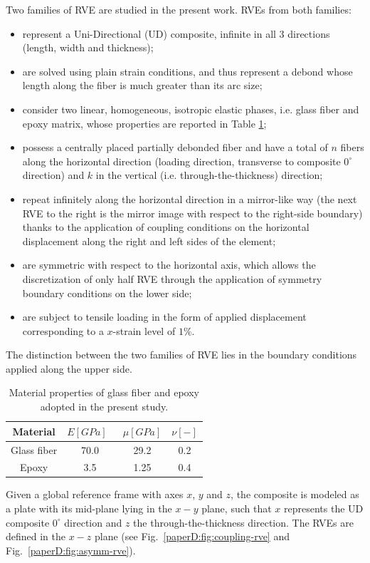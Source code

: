 Two families of RVE are studied in the present work. RVEs from both families:
\begin{itemize}
\item represent a Uni-Directional (UD) composite, infinite in all 3 directions (length, width and thickness);
\item are solved using plain strain conditions, and thus represent a debond whose length along the fiber is much greater than its arc size;
\item consider two linear, homogeneous, isotropic elastic phases, i.e. glass fiber and epoxy matrix, whose properties are reported in Table \ref{paperD:tab:phaseprop};
\item possess a centrally placed partially debonded fiber and have a total of $n$ fibers along the horizontal direction (loading direction, transverse to composite $0^{\circ}$ direction) and $k$ in the vertical (i.e. through-the-thickness) direction;
\item repeat infinitely along the horizontal direction in a mirror-like way (the next RVE to the right is the mirror image with respect to the right-side boundary) thanks to the application of coupling conditions on the horizontal displacement along the right and left sides of the element;
\item are symmetric with respect to the horizontal axis, which allows the discretization of only half RVE through the application of symmetry boundary conditions on the lower side;
\item are subject to tensile loading in the form of applied displacement corresponding to a $x$-strain level of $1\%$.
\end{itemize}
The distinction between the two families of RVE lies in the boundary conditions applied along the upper side.

\begin{table}[!htbp]
 \centering
 \caption{Material properties of glass fiber and epoxy adopted in the present study.}
 \begin{tabular}{cccc}
\textbf{Material} & \textbf{$E\left[GPa\right]$}\ & \textbf{$\mu\left[GPa\right]$} & \textbf{$\nu\left[-\right]$} \\
\midrule
Glass fiber    & 70.0  & 29.2   & 0.2  \\
Epoxy    & 3.5    & 1.25   & 0.4
\end{tabular}
\label{paperD:tab:phaseprop}
\end{table}

Given a global reference frame with axes $x$, $y$ and $z$, the composite is modeled as a plate with its mid-plane lying in the $x-y$ plane, such that $x$ represents the UD composite $0^{\circ}$ direction and $z$ the through-the-thickness direction. The RVEs are defined in the $x-z$ plane (see Fig.~\ref{paperD:fig:coupling-rve} and Fig.~\ref{paperD:fig:asymm-rve}).

